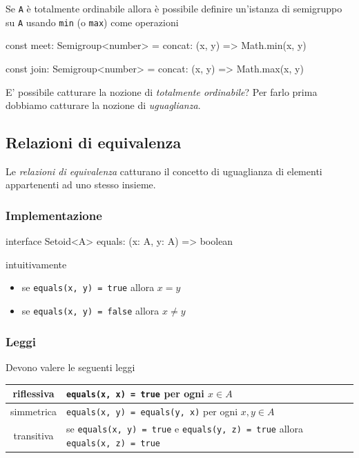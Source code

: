 \documentclass[12pt]{article}
\theoremstyle{definition}
\newenvironment{code}
  {\vspace{0.5cm} \VerbatimEnvironment\begin{typescriptcode}}
  {\end{typescriptcode} \vspace{0.2cm}}
\begin{document}
Se \texttt{A} è totalmente ordinabile allora è possibile definire un'istanza di semigruppo su \texttt{A}
usando \texttt{min} (o \texttt{max}) come operazioni

\begin{code}
const meet: Semigroup<number> = {
  concat: (x, y) => Math.min(x, y)
}

const join: Semigroup<number> = {
  concat: (x, y) => Math.max(x, y)
}
\end{code}

E' possibile catturare la nozione di \emph{totalmente ordinabile}? Per farlo prima dobbiamo catturare la nozione di \emph{uguaglianza}.

\subsection{Relazioni di equivalenza}

Le \emph{relazioni di equivalenza} catturano il concetto di uguaglianza di elementi appartenenti ad uno stesso insieme.

\subsubsection{Implementazione}

\begin{code}
interface Setoid<A> {
  equals: (x: A, y: A) => boolean
}
\end{code}

intuitivamente

\begin{itemize}
\item se \texttt{equals(x, y) = true} allora $x = y$
\item se \texttt{equals(x, y) = false} allora $x \neq y$
\end{itemize}

\subsubsection{Leggi}

Devono valere le seguenti leggi

\begin{center}
\bgroup
\def\arraystretch{1.5}
\begin{tabular}{ |c|p{10cm}| }
\hline
riflessiva & \texttt{equals(x, x) = true} per ogni $x \in A$ \\
\hline
simmetrica & \texttt{equals(x, y) = equals(y, x)} per ogni $x, y \in A$ \\
\hline
transitiva & se \texttt{equals(x, y) = true} e \texttt{equals(y, z) = true} allora \texttt{equals(x, z) = true} \\
\hline
\end{tabular}
\egroup
\end{center}
\end{document}
